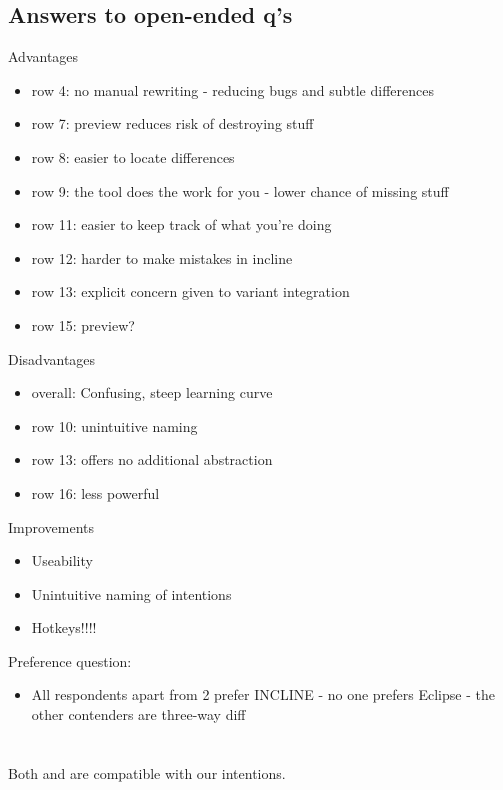 \subsection{Answers to open-ended q's}
Advantages  
\begin{itemize}
    \item row 4: no manual rewriting - reducing bugs and subtle differences
    \item row 7: preview reduces risk of destroying stuff
    \item row 8: easier to locate differences
    \item row 9: the tool does the work for you - lower chance of missing stuff
    \item row 11: easier to keep track of what you're doing
    \item row 12: harder to make mistakes in incline
    \item row 13: explicit concern given to variant integration
    \item row 15: preview?
\end{itemize}

Disadvantages
\begin{itemize}
    \item overall: Confusing, steep learning curve
    \item row 10: unintuitive naming
    \item row 13: offers no additional abstraction
    \item row 16: less powerful
\end{itemize}

Improvements
\begin{itemize}
    \item Useability
    \item Unintuitive naming of intentions
    \item Hotkeys!!!!
\end{itemize}

Preference question:
\begin{itemize}
    \item All respondents apart from 2 prefer INCLINE - no one prefers Eclipse - the other contenders are three-way diff
\end{itemize}


\section{\RQA}
Both \cite{neves2011evolution} and \cite{passos2016coevolution} are compatible with our intentions.

